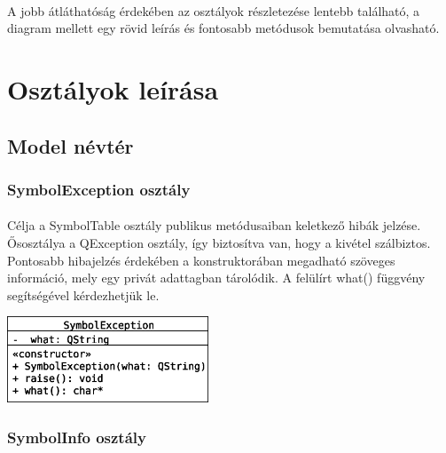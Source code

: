 \documentclass[12pt]{report}
\begin{document}
\paragraph{}
A jobb átláthatóság érdekében az osztályok részletezése lentebb található, a diagram mellett egy rövid leírás és fontosabb metódusok bemutatása olvasható.
\newpage
\section{Osztályok leírása}
\subsection{Model névtér}
\subsubsection{SymbolException osztály}
\paragraph{}
Célja a SymbolTable osztály publikus metódusaiban keletkező hibák jelzése. Ősosztálya a QException osztály, így biztosítva van, hogy a kivétel szálbiztos. Pontosabb hibajelzés érdekében a konstruktorában megadható szöveges információ, mely egy privát adattagban tárolódik. A felülírt what() függvény segítségével kérdezhetjük le.
\begin{center}
\includegraphics[width=6cm]{pics/uml/SymbolException}
\end{center}
\subsubsection{SymbolInfo osztály}
\end{document}
